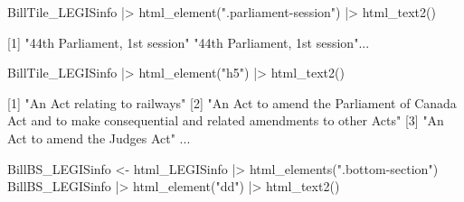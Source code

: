 \documentclass[
  letterpaper,
  DIV=11,
  numbers=noendperiod,
  oneside]{scrreprt}
\newenvironment{Shaded}{\begin{snugshade}}{\end{snugshade}}
\newcommand{\ExtensionTok}[1]{\textcolor[rgb]{0.00,0.23,0.31}{#1}}
\newcommand{\KeywordTok}[1]{\textcolor[rgb]{0.00,0.23,0.31}{#1}}
\newcommand{\NormalTok}[1]{\textcolor[rgb]{0.00,0.23,0.31}{#1}}
\newcommand{\OperatorTok}[1]{\textcolor[rgb]{0.37,0.37,0.37}{#1}}
\newcommand{\StringTok}[1]{\textcolor[rgb]{0.13,0.47,0.30}{#1}}
\begin{document}
\begin{Shaded}
\begin{Highlighting}[]
\ExtensionTok{BillTile\_LEGISinfo} \KeywordTok{|}\OperatorTok{\textgreater{}}\NormalTok{ html\_element}\KeywordTok{(}\StringTok{".parliament{-}session"}\KeywordTok{)} \KeywordTok{|}\OperatorTok{\textgreater{}}\NormalTok{ html\_text2}\KeywordTok{()}
\end{Highlighting}
\end{Shaded}

\begin{Shaded}
\begin{Highlighting}[]
\ExtensionTok{[1]} \StringTok{"44th Parliament, 1st session"} \StringTok{"44th Parliament, 1st session"}\NormalTok{...}
\end{Highlighting}
\end{Shaded}

\begin{Shaded}
\begin{Highlighting}[]
\ExtensionTok{BillTile\_LEGISinfo} \KeywordTok{|}\OperatorTok{\textgreater{}}\NormalTok{ html\_element}\KeywordTok{(}\StringTok{"h5"}\KeywordTok{)} \KeywordTok{|}\OperatorTok{\textgreater{}}\NormalTok{ html\_text2}\KeywordTok{()}
\end{Highlighting}
\end{Shaded}

\begin{Shaded}
\begin{Highlighting}[]
\ExtensionTok{[1]} \StringTok{"An Act relating to railways"}                                                                                                                                                                                                                                                                                  
 \ExtensionTok{[2]} \StringTok{"An Act to amend the Parliament of Canada Act and to make }
\StringTok{ consequential and related amendments to other Acts"}                                                                                                                                                                                                  
 \ExtensionTok{[3]} \StringTok{"An Act to amend the Judges Act"}   
\ExtensionTok{...}
\end{Highlighting}
\end{Shaded}

\begin{Shaded}
\begin{Highlighting}[]
\ExtensionTok{BillBS\_LEGISinfo} \OperatorTok{\textless{}}\NormalTok{{-} html\_LEGISinfo }\KeywordTok{|}\OperatorTok{\textgreater{}}\NormalTok{ html\_elements}\KeywordTok{(}\StringTok{".bottom{-}section"}\KeywordTok{)}
\ExtensionTok{BillBS\_LEGISinfo} \KeywordTok{|}\OperatorTok{\textgreater{}}\NormalTok{ html\_element}\KeywordTok{(}\StringTok{"dd"}\KeywordTok{)} \KeywordTok{|}\OperatorTok{\textgreater{}}\NormalTok{ html\_text2}\KeywordTok{()}
\end{Highlighting}
\end{Shaded}
\end{document}
